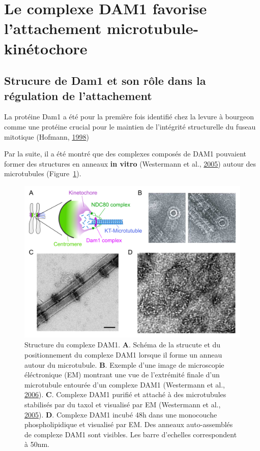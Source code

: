 \documentclass[12pt,a4paper,twoside,openright]{book}
\begin{document}
\section{Le complexe DAM1 favorise l'attachement
microtubule-kinétochore}\label{le-complexe-dam1-favorise-lattachement-microtubule-kinuxe9tochore}

\label{sec:dam1}

\subsection{Strucure de Dam1 et son rôle dans la régulation de
l'attachement}\label{strucure-de-dam1-et-son-ruxf4le-dans-la-ruxe9gulation-de-lattachement}

La protéine Dam1 a été pour la première fois identifié chez la levure à
bourgeon comme une protéine crucial pour le maintien de l'intégrité
structurelle du fuseau mitotique (Hofmann,
\hyperref[ref-Hofmann1998]{1998})

Par la suite, il a été montré que des complexes composés de DAM1
pouvaient former des structures en anneaux \textbf{in vitro} (Westermann
et al., \hyperref[ref-Westermann2005]{2005}) autour des microtubules
(Figure~\ref{fig:dam1-struct}).

\begin{figure}[htbp]
\centering
\includegraphics{figures/annexes/dam1-struct.png}
\caption[Structure du complexe DAM1]{\label{fig:dam1-struct}Structure du
complexe DAM1. \textbf{A}. Schéma de la strucute et du positionnement du
complexe DAM1 lorsque il forme un anneau autour du microtubule.
\textbf{B}. Exemple d'une image de microscopie éléctronique (EM)
montrant une vue de l'extrémité finale d'un microtubule entourée d'un
complexe DAM1 (Westermann et al., \hyperref[ref-Westermann2006]{2006}).
\textbf{C}. Complexe DAM1 purifié et attaché à des microtubules
stabilisés par du taxol et visualisé par EM (Westermann et al.,
\hyperref[ref-Westermann2005]{2005}). \textbf{D}. Complexe DAM1 incubé
48h dans une monocouche phospholipidique et visualisé par EM. Des
anneaux auto-assemblés de complexe DAM1 sont visibles. Les barre
d'echelles correspondent à 50nm.}
\end{figure}
\end{document}
